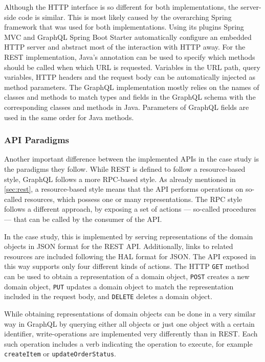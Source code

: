 Although the \ac{HTTP} interface is so different for both implementations, the server-side code is similar.
This is most likely caused by the overarching Spring framework that was used for both implementations.
Using its plugins Spring \acs{MVC} and GraphQL Spring Boot Starter automatically configure an embedded \ac{HTTP} server and abstract most of the interaction with \ac{HTTP} away.
For the \ac{REST} implementation, Java's annotation can be used to specify which methods should be called when which \ac{URL} is requested.
Variables in the \ac{URL} path, query variables, \ac{HTTP} headers and the request body can be automatically injected as method parameters.
The GraphQL implementation mostly relies on the names of classes and methods to match types and fields in the GraphQL schema with the corresponding classes and methods in Java.
Parameters of GraphQL fields are used in the same order for Java methods.

\subsubsection{\acs{API} Paradigms}

Another important difference between the implemented \acp{API} in the case study is the paradigms they follow.
While \ac{REST} is defined to follow a resource-based style, GraphQL follows a more \ac{RPC}-based style.
As already mentioned in \autoref{sec:rest}, a resource-based style means that the \ac{API} performs operations on so-called resources, which possess one or many representations.
The \ac{RPC} style follows a different approach, by exposing a set of actions --- so-called procedures --- that can be called by the consumer of the \ac{API}.

In the case study, this is implemented by serving representations of the domain objects in \ac{JSON} format for the \ac{REST} \ac{API}.
Additionally, links to related resources are included following the \ac{HAL} format for \ac{JSON}.
The \ac{API} exposed in this way supports only four different kinds of actions.
The \ac{HTTP} \texttt{GET} method can be used to obtain a representation of a domain object, \texttt{POST} creates a new domain object, \texttt{PUT} updates a domain object to match the representation included in the request body, and \texttt{DELETE} deletes a domain object.

While obtaining representations of domain objects can be done in a very similar way in GraphQL by querying either all objects or just one object with a certain identifier, write-operations are implemented very differently than in \ac{REST}.
Each such operation includes a verb indicating the operation to execute, for example \texttt{createItem} or \texttt{updateOrderStatus}.

